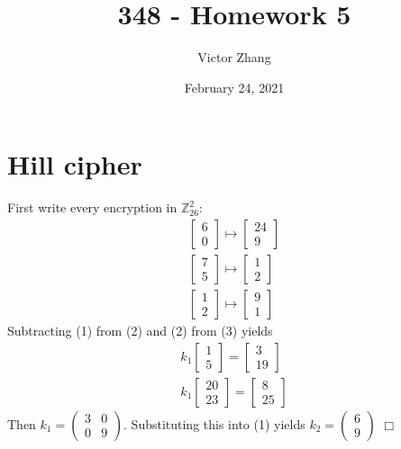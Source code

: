 \documentclass{article}
\title{348 - Homework 5}
\author{Victor Zhang}
\date{February 24, 2021}
\begin{document}
\maketitle

\section*{Hill cipher}
First write every encryption in $\mathbb{Z}_{26}^2$:\\
\begin{gather}
\begin{bmatrix}6 \\ 0\end{bmatrix} \mapsto \begin{bmatrix}24 \\ 9\end{bmatrix}\\
\begin{bmatrix}7 \\ 5\end{bmatrix} \mapsto \begin{bmatrix}1 \\ 2\end{bmatrix}\\
\begin{bmatrix}1 \\ 2\end{bmatrix} \mapsto \begin{bmatrix}9 \\ 1\end{bmatrix}
\end{gather}
Subtracting (1) from (2) and (2) from (3) yields
\begin{gather*}
k_1\begin{bmatrix}1 \\ 5\end{bmatrix} = \begin{bmatrix}3 \\ 19\end{bmatrix}\\
k_1\begin{bmatrix}20 \\ 23\end{bmatrix} = \begin{bmatrix}8 \\ 25\end{bmatrix}
\end{gather*}
Then $k_1 = \left(\begin{smallmatrix}3 & 0 \\ 0 & 9\end{smallmatrix}\right)$. Substituting this into (1) yields $k_2 = \left(\begin{smallmatrix}6 \\ 9\end{smallmatrix}\right)$ $\Box$
\end{document}
